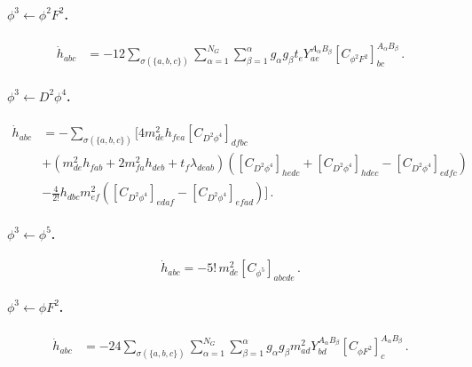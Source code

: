 \paragraph{\texorpdfstring{$\phi^{3} \leftarrow \phi^2 F^2$}{phi3fromphi2F2}.}

\begin{align}
    \dot h_{abc} &= -12 \sum_{\sigma(\{a,b,c\})} \sum_{\alpha=1}^{N_G} \sum_{\beta=1}^{\alpha} g_\alpha g_\beta t_{e} Y^{A_\alpha B_\beta}_{ae} \left[C_{\phi^2 F^2}\right]^{A_\alpha B_\beta}_{bc}\,.
    \label{eq:phi2F2_to_phi3}
\end{align}

\paragraph{\texorpdfstring{$\phi^{3} \leftarrow D^2\phi^4$}{phi3fromD2phi4}.}

\begin{align}
    \dot h_{abc} &= - \sum_{\sigma(\{a,b,c\})} \Bigg[4 m_{de}^2 h_{fea}\left[C_{D^2\phi^4}\right]_{dfbc}\nonumber \\
    &+\left(m^2_{de} h_{fab}+2m_{fa}^2 h_{deb}+t_f \lambda_{deab}\right)\left(\left[C_{D^2\phi^4}\right]_{hedc}+\left[C_{D^2\phi^4}\right]_{hdec}-\left[C_{D^2\phi^4}\right]_{edfc}\right)\nonumber \\
    &
    -\frac{4}{2!}h_{dbc}
    m^2_{ef}\left(
    \left[C_{D^2\phi^4}\right]_{edaf}-\left[C_{D^2\phi^4}\right]_{efad}
    \right)
    \Bigg]\,.
    \label{eq:phi3<-D2phi4}
\end{align}

\paragraph{\texorpdfstring{$\phi^3 \leftarrow \phi^5$}{phi3fromphi5}.}

\begin{equation}
    \dot h_{abc} = -5!\,m^2_{de}\left[C_{\phi^5}\right]_{abcde}\,.
\end{equation}

\paragraph{\texorpdfstring{$\phi^3 \leftarrow \phi F^2$}{phi3fromphiF2}.}

\begin{align}
    \dot h_{abc} &=
    -24\sum_{\sigma(\{a,b,c\})} \sum_{\alpha=1}^{N_G} \sum_{\beta=1}^{\alpha} g_\alpha g_\beta m^2_{ad} Y_{bd}^{A_\alpha B_\beta} \left[C_{\phi F^2}\right]_{c}^{A_\alpha B_\beta}\,.
    \label{eq:phi3<-phiF2}
\end{align}

